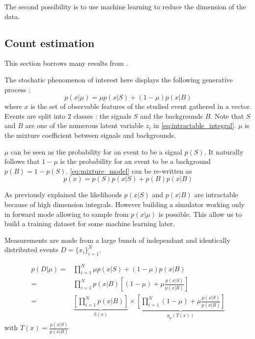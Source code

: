 The second possibility is to use machine learning to reduce the dimension of the data.








\subsection{Count estimation} %
\label{sub:count_estimation}




This section borrows many results from \cite{Neal:2007zz}.

The stochatic phenomenon of interest here displays the following generative process :
\begin{equation}
	\label{eq:mixture_model}
	p(x|\mu) = \mu p(x|S) + (1-\mu) p(x|B)
\end{equation}
where $x$ is the set of observable features of the studied event gathered in a vector.
Events are split into 2 classes : the signals $S$ and the backgrounds $B$.
Note that $S$ and $B$ are one of the numerous latent variable $z_i$ in \autoref{eq:intractable_integral}.
$\mu$ is the mixture coefficient between signals and backgrounds.

$\mu$ can be seen as the probability for an event to be a signal $p(S)$. 
It naturally follows that $1-\mu$ is the probability for an event to be a background $p(B)=1-p(S)$.
\autoref{eq:mixture_model} can be re-written as
\begin{equation}
	p(x) = p(S)p(x|S) + p(B)p(x|B)
\end{equation}

As previously explained the likelihoods $p(x|S)$ and $p(x|B)$ are intractable because of high dimension integrals.
However building a simulator working only in forward mode allowing to sample from $p(x|\mu)$ is possible.
This allow us to build a training dataset for some machine learning later.

Measurements are made from a large bunch of independant and identically distributed events $D=\{x_i\}_{i=1}^N$.

\begin{align*}
	p(D|\mu) =& \prod_{i=1}^N \mu p(x|S) + (1-\mu) p(x|B) \\
	       =& \prod_{i=1}^N p(x|B) \left [(1-\mu) + \mu \frac{p(x|S)}{p(x|B)} \right ]\\
	       =& \underbrace{\left[ \prod_{i=1}^N p(x|B) \right ]}_{h(x)} \times 
	       \underbrace{\left [\prod_{i=1}^N (1-\mu) + \mu \frac{p(x|S)}{p(x|B)} \right ]}_{g_\mu(T(x))}
\end{align*}
with $T(x) = \frac{p(x|S)}{p(x|B)} $

